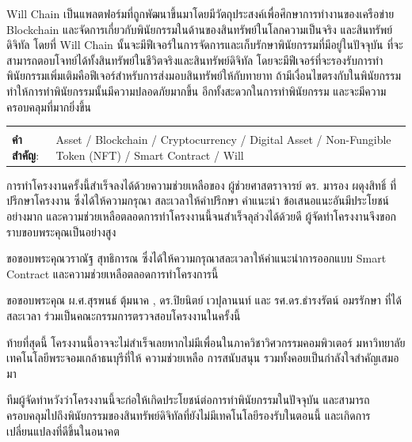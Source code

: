 \documentclass[12pt,oneside,openright,a4paper]{cpe-thai-project}
\begin{document}
\tab Will Chain เป็นแพลตฟอร์มที่ถูกพัฒนาขึ้นมาโดยมีวัตถุประสงค์เพื่อศึกษาการทำงานของเครือข่าย Blockchain  และจัดการเกี่ยวกับพินัยกรรมในด้านของสินทรัพย์ในโลกความเป็นจริง และสินทรัพย์ดิจิทัล โดยที่ Will Chain นั้นจะมีฟีเจอร์ในการจัดการและเก็บรักษาพินัยกรรมที่มีอยู่ในปัจจุบัน ที่จะสามารถตอบโจทย์ได้ทั้งสินทรัพย์ในชีวิตจริงและสินทรัพย์ดิจิทัล โดยจะมีฟีเจอร์ที่จะรองรับการทำพินัยกรรมเพิ่มเติมคือฟีเจอร์สำหรับการส่งมอบสินทรัพย์ให้กับทายาท ถ้ามีเงื่อนไขตรงกับในพินัยกรรม ทำให้การทำพินัยกรรมนั้นมีความปลอดภัยมากขึ้น อีกทั้งสะดวกในการทำพินัยกรรม และจะมีความครอบคลุมที่มากยิ่งขึ้น
\begin{flushleft}
\begin{tabular*}{\textwidth}{@{}lp{}}
 & \\

\textbf{คำสำคัญ}: & Asset / Blockchain / Cryptocurrency / Digital Asset / Non-Fungible Token (NFT) /  Smart Contract / Will 
\end{tabular*}
\end{flushleft}
\endabstract


\preface
\tab การทําโครงงานครั้งนี้สําเร็จลงได้ด้วยความช่วยเหลือของ ผู้ช่วยศาสตราจารย์ ดร. มารอง ผดุงสิทธิ์ ที่ปรึกษาโครงงาน ซึ่งได้ให้ความกรุณา สละเวลาให้คําปรึกษา คําแนะนํา ข้อเสนอแนะอันมีประโยชน์อย่างมาก และความช่วยเหลือตลอดการทําโครงงานนี้จนสําเร็จลุล่วงได้ด้วยดี ผู้จัดทําโครงงานจึงขอกราบขอบพระคุณเป็นอย่างสูง

\tab ขอขอบพระคุณวราณัฐ สุทธิการณ ซึ่งได้ให้ความกรุณาสละเวลาให้คําแนะนําการออกแบบ Smart Contract และความช่วยเหลือตลอดการทำโครงการนี้

\tab ขอขอบพระคุณ ผ.ศ.สุรพนธ์ ตุ้มนาค , ดร.ปิยนิตย์ เวปุลานนท์ และ รศ.ดร.ธํารงรัตน์ อมรรักษา ที่ได้สละเวลา
ร่วมเป็นคณะกรรมการตรวจสอบโครงงานในครั้งนี้ 

\tab ท้ายที่สุดนี้ โครงงานนี้อาจจะไม่สําเร็จเลยหากไม่มีเพื่อนในภาควิชาวิศวกรรมคอมพิวเตอร์ มหาวิทยาลัยเทคโนโลยีพระจอมเกล้าธนบุรีที่ให้ 
ความช่วยเหลือ การสนับสนุน รวมทั้งคอยเป็นกําลังใจสําคัญเสมอมา 

\tab ทีมผู้จัดทำหวังว่าโครงงานนี้จะก่อให้เกิดประโยชน์ต่อการทำพินัยกรรมในปัจจุบัน และสามารถครอบคลุมไปถึงพินัยกรรมของสินทรัพย์ดิจิทัลที่ยังไม่มีเทคโนโลยีรองรับในตอนนี้ และเกิดการเปลี่ยนแปลงที่ดีขึ้นในอนาคต

\tableofcontents                    
\listoftables
\listoffigures                      
\end{document}
